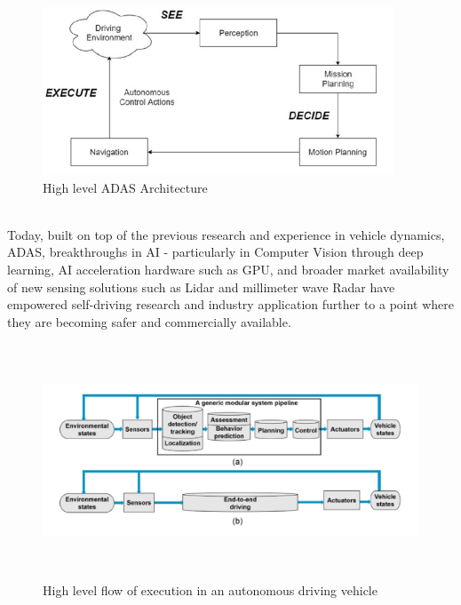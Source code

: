 \begin{figure}[H]
    \centering
    \includegraphics[width=\textwidth,height=5cm,keepaspectratio=true]{src/Images/adas.PNG}
    \caption{
      High level ADAS Architecture \cite{pereira2012integrated}
    }
\end{figure}
\\
Today, built on top of the previous research and experience in vehicle dynamics, ADAS, breakthroughs in AI - particularly in Computer Vision through deep learning, AI acceleration hardware such as GPU, and broader market availability of new sensing solutions such as Lidar and millimeter wave Radar have empowered self-driving research and industry application further to a point where they are becoming safer and commercially available. 
\cite{okuda2014survey}
\begin{figure}[H]
    \centering
    \includegraphics[width=\textwidth,height=7cm,keepaspectratio=true]{src/Images/auv_img.PNG}
    \caption{
      High level flow of execution in an autonomous driving vehicle \cite{okuda2014survey}
    }
\end{figure}
\\


